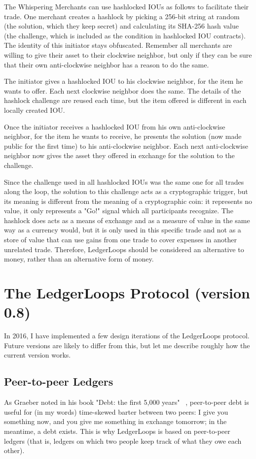 \documentclass[11pt,twoside,a4paper]{article}
\begin{document}
The Whispering Merchants can use hashlocked IOUs as follows to facilitate their trade. One merchant creates a hashlock by picking a 256-bit string at random (the solution, which they keep secret) and calculating its SHA-256 hash value (the challenge, which is included as the condition in hashlocked IOU contracts). The identity of this initiator stays obfuscated. Remember all merchants are willing to give their asset to their clockwise neighbor, but only if they can be sure that their own anti-clockwise neighbor has a reason to do the same.

The initiator gives a hashlocked IOU to his clockwise neighbor, for the item he wants to offer. Each next clockwise neighbor does the same. The details of the hashlock challenge are reused each time, but the item offered is different in each locally created IOU.

Once the initiator receives a hashlocked IOU from his own anti-clockwise neighbor, for the item he wants to receive, he presents the solution (now made public for the first time) to his anti-clockwise neighbor. Each next anti-clockwise neighbor now gives the asset they offered in exchange for the solution to the challenge.

Since the challenge used in all hashlocked IOUs was the same one for all trades along the loop, the solution to this challenge acts as a cryptographic trigger, but its meaning is different from the meaning of a cryptographic coin: it represents no value, it only represents a "Go!" signal which all participants recognize.
The hashlock does acts as a means of exchange and as a measure of value in the same way as a currency would, but it is only used in this specific trade and not as a store of value that can use gains from one trade to cover expenses in another unrelated trade.
Therefore, LedgerLoops should be considered an alternative to money, rather than an alternative form of money.

\section{The LedgerLoops Protocol (version 0.8)}
In 2016, I have implemented a few design iterations of the LedgerLoops protocol. Future versions are likely to differ from this, but let me describe roughly how the current version works.

\subsection{Peer-to-peer Ledgers}
As Graeber noted in his book "Debt: the first 5,000 years" ~\cite{Graeber2011}, peer-to-peer debt is useful for (in my words) time-skewed barter between two peers: I give you something now, and you give me something in exchange tomorrow; in the meantime, a debt exists. This is why LedgerLoops is based on peer-to-peer ledgers (that is, ledgers on which two people keep track of what they owe each other).
\end{document}
